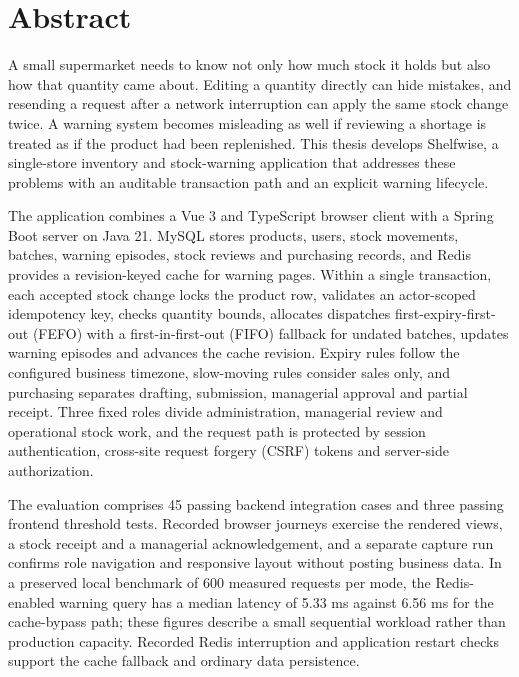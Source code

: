 \documentclass[12pt,a4paper,oneside]{report}
\begin{document}
\chapter*{Abstract}


A small supermarket needs to know not only how much stock it holds but also how that quantity came about. Editing a quantity directly can hide mistakes, and resending a request after a network interruption can apply the same stock change twice. A warning system becomes misleading as well if reviewing a shortage is treated as if the product had been replenished. This thesis develops Shelfwise, a single-store inventory and stock-warning application that addresses these problems with an auditable transaction path and an explicit warning lifecycle.


The application combines a Vue 3 and TypeScript browser client with a Spring Boot server on Java 21. MySQL stores products, users, stock movements, batches, warning episodes, stock reviews and purchasing records, and Redis provides a revision-keyed cache for warning pages. Within a single transaction, each accepted stock change locks the product row, validates an actor-scoped idempotency key, checks quantity bounds, allocates dispatches first-expiry-first-out (FEFO) with a first-in-first-out (FIFO) fallback for undated batches, updates warning episodes and advances the cache revision. Expiry rules follow the configured business timezone, slow-moving rules consider sales only, and purchasing separates drafting, submission, managerial approval and partial receipt. Three fixed roles divide administration, managerial review and operational stock work, and the request path is protected by session authentication, cross-site request forgery (CSRF) tokens and server-side authorization.


The evaluation comprises 45 passing backend integration cases and three passing frontend threshold tests. Recorded browser journeys exercise the rendered views, a stock receipt and a managerial acknowledgement, and a separate capture run confirms role navigation and responsive layout without posting business data. In a preserved local benchmark of 600 measured requests per mode, the Redis-enabled warning query has a median latency of 5.33 ms against 6.56 ms for the cache-bypass path; these figures describe a small sequential workload rather than production capacity. Recorded Redis interruption and application restart checks support the cache fallback and ordinary data persistence.
\end{document}
